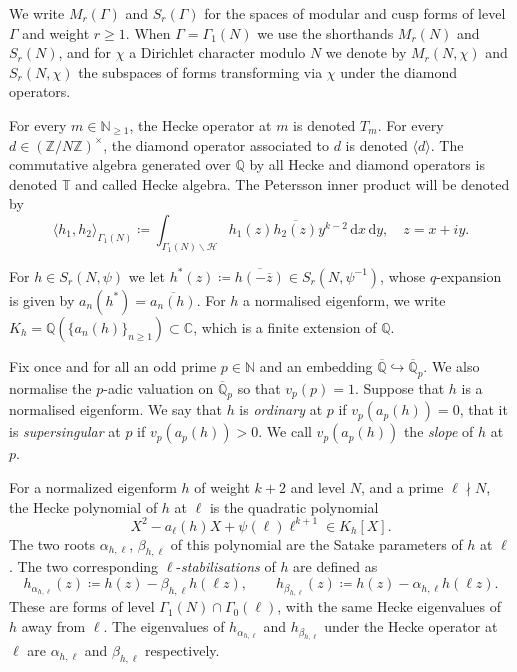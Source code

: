 \documentclass[11pt, a4paper, reqno]{amsart}
\theoremstyle{definition}
\theoremstyle{plain}
\theoremstyle{remark}
\newcommand{\numberset}{\mathbb}
\newcommand{\C}{\numberset{C}}
\newcommand{\Q}{\numberset{Q}}
\newcommand{\Z}{\numberset{Z}}
\newcommand{\N}{\numberset{N}}
\newcommand{\HP}{\mathcal{H}}
\renewcommand{\ge}{\geqslant}
\renewcommand{\geq}{\ge}
\begin{document}
  We write $M_r(\Gamma)$ and $S_r(\Gamma)$ for the spaces of modular and cusp forms of level $\Gamma$ and weight $r \geq 1$. When $\Gamma = \Gamma_1(N)$ we use the shorthands $M_r(N)$ and $S_r(N)$, and for $\chi$ a Dirichlet character modulo $N$ we denote by $M_r(N,\chi)$ and $S_r(N, \chi)$ the subspaces of forms transforming via $\chi$ under the diamond operators.

  For every $m\in \N_{\geq 1}$, the Hecke operator at $m$ is denoted $T_m$. For every $d\in (\Z/N\Z)^{\times}$, the diamond operator associated to $d$ is denoted $\langle d \rangle$. The commutative algebra generated over $\Q$ by all Hecke and diamond operators is denoted $\mathbb{T}$ and called Hecke algebra. %
  The Petersson inner product will be denoted by
  \[
   \langle h_1,h_2 \rangle_{\Gamma_1(N)} \coloneqq \int_{\Gamma_1(N) \backslash \HP} h_1(z)\overline{h_2(z)} y^{k - 2} \, \mathrm{d}x\, \mathrm{d}y, \quad z = x + iy.
  \]

  For $h \in S_r(N, \psi)$ we let $h^*(z) \coloneqq \overline{h(-\overline{z})} \in S_r(N, \psi^{-1})$, whose $q$-expansion is given by $a_n(h^*) = \overline{a_n(h)}$. For $h$ a normalised eigenform, we write $K_h = \Q(\{a_n(h)\}_{n\geq 1}) \subset \C$, which is a finite extension of $\Q$.%

  Fix once and for all an odd prime $p\in\N$ and an embedding $\overline{\Q} \hookrightarrow \overline{\Q}_p$. We also normalise the $p$-adic valuation on $\overline{\Q}_p$ so that $v_p(p) = 1$. Suppose that $h$ is a normalised eigenform. We say that $h$ is \emph{ordinary} at $p$ if $v_p(a_p(h))=0$, that it is \emph{supersingular} at $p$ if $v_p(a_p(h))>0$. We call $v_p(a_p(h))$ the \emph{slope} of $h$ at $p$.

  For a normalized eigenform $h$ of weight $k + 2$ and level $N$, and a prime $\ell \nmid N$, the Hecke polynomial of $h$ at $\ell$ is the quadratic polynomial
  \[
   X^2 - a_\ell(h)X + \psi(\ell)\ell^{k+1} \in K_h[X].
  \]
  The two roots $\alpha_{h,\ell}$, $\beta_{h,\ell}$ of this polynomial are the Satake parameters of $h$ at $\ell$. The two corresponding $\ell$-\emph{stabilisations} of $h$ are defined as
  \[
   h_{\alpha_{h,\ell}}(z) \coloneqq h(z) - \beta_{h,\ell}h(\ell z), \qquad h_{\beta_{h,\ell}}(z) \coloneqq h(z) - \alpha_{h,\ell}h(\ell z).
  \]
  These are forms of level $\Gamma_1(N) \cap \Gamma_0(\ell)$, with the same Hecke eigenvalues of $h$ away from $\ell$. The eigenvalues of $h_{\alpha_{h,\ell}}$ and $h_{\beta_{h,\ell}}$ under the Hecke operator at $\ell$ are $\alpha_{h,\ell}$ and $\beta_{h,\ell}$ respectively.
\end{document}
